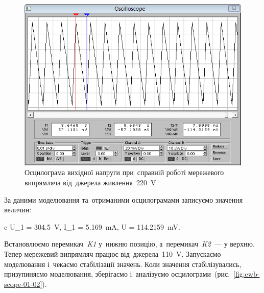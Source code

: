 \documentclass[
	a4paper,
	oneside,
	BCOR = 10mm,
	DIV = 12,
	12pt,
	headings = normal,
]{scrartcl}
\newcommand{\schel}[1]{\textit{#1}}
\begin{document}
			\begin{figure}[!htbp]
				\centering
				\includegraphics[height = 8\baselineskip]{./assets/y03s02-pcdiag-lab-01-p01-01b.png}
				\caption{Осцилограма вихідної напруги при~справній роботі мережевого випрямляча від~джерела живлення~\SI{220}{\volt}}
				\label{fig:ewb-scope-01-01}
			\end{figure}
			
			За даними моделювання та~отриманими осцилограмами записуємо значення величин:
			\begin{IEEEeqnarray*}{c}
				U_1 = \SI{304.5}{\volt}, \quad 
				I_1 = \SI{5.169}{\milli\ampere}, \quad
				\Delta U = \SI{114.2159}{\milli\volt}. 
			\end{IEEEeqnarray*}

			Встановлюємо перемикач~\schel{K1} у~нижню позицію, а~перемикач~\schel{K2}~— у верхню. Тепер мережевий випрямляч працює від~джерела~\SI{110}{\volt}. Запускаємо моделювання і~чекаємо стабілізації значень. Коли значення стабілізувались, призупиняємо моделювання, зберігаємо і~аналізуємо осцилограми~(рис.~\ref{fig:ewb-scope-01-02}).
\end{document}

